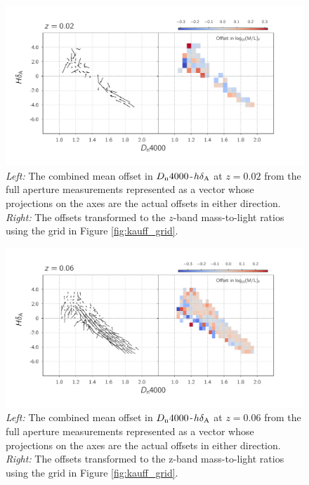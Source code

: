 \begin{figure}
\includegraphics[width=\textwidth]{figures/mlz_offset_a.pdf}
\caption[  \emph{Left:} The combined mean offset in 
$D_{\rm n}4000$-$h\delta_{\rm A}$ at $z=0.02$ from the full aperture 
measurements, represented as a vector whose projections on the axes 
are the actual offsets in either direction. 
\emph{Right:} The offsets transformed to the $z$-band mass-to-light ratios 
using the grid in Figure \ref{fig:kauff_grid}. ]{ \emph{Left:} The combined 
mean offset in $D_{\rm n}4000$-$h\delta_{\rm A}$ at $z=0.02$ from 
the full aperture measurements represented as a vector whose projections 
on the axes are the actual offsets in either direction. 
\emph{Right:} The offsets transformed to the $z$-band mass-to-light 
ratios using the grid in Figure \ref{fig:kauff_grid}.
\label{fig:offset_quiver1}}
\end{figure}

\begin{figure}
\includegraphics[width=\textwidth]{figures/mlz_offset_b.pdf}
\caption[  \emph{Left:} The combined mean offset in $D_{\rm n}4000$-$h\delta_{\rm A}$ at $z=0.02$ from the full aperture measurements represented as a vector whose projections on the axes are the actual offsets in either direction. \emph{Right:} The offsets transformed to the z-band mass-to-light ratios using the grid in Figure \ref{fig:kauff_grid}. ]{ \emph{Left:} The combined mean offset in $D_{\rm n}4000$-$h\delta_{\rm A}$ at $z=0.06$ from the full aperture measurements represented as a vector whose projections on the axes are the actual offsets in either direction. \emph{Right:} The offsets transformed to the z-band mass-to-light ratios using the grid in Figure \ref{fig:kauff_grid}.
\label{fig:offset_quiver2}}
\end{figure}


